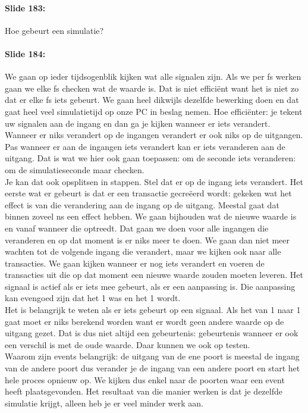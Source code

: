 \documentclass[10pt,a4paper]{book}
\begin{document}
\paragraph{Slide 183:} Hoe gebeurt een simulatie?

\paragraph{Slide 184:} We gaan op ieder tijdsogenblik kijken wat alle signalen zijn. Als we per fs werken gaan we elke fs checken wat de waarde is. Dat is niet effici\"ent want het is niet zo dat er elke fs iets gebeurt. We gaan heel dikwijls dezelfde bewerking doen en dat gaat heel veel simulatietijd op onze PC in beslag nemen. Hoe effici\"enter: je tekent uw signalen aan de ingang en dan ga je kijken wanneer er iets verandert. Wanneer er niks verandert op de ingangen verandert er ook niks op de uitgangen. Pas wanneer er aan de ingangen iets verandert kan er iets veranderen aan de uitgang. Dat is wat we hier ook gaan toepassen: om de seconde iets veranderen: om de simulatieseconde maar checken.\\
Je kan dat ook opsplitsen in stappen. Stel dat er op de ingang iets verandert. Het eerste wat er gebeurt is dat er een transactie gecre\"eerd wordt: gekeken wat het effect is van die verandering aan de ingang op de uitgang. Meestal gaat dat binnen zoveel ns een effect hebben. We gaan bijhouden wat de nieuwe waarde is en vanaf wanneer die optreedt. Dat gaan we doen voor alle ingangen die veranderen en op dat moment is er niks meer te doen. We gaan dan niet meer wachten tot de volgende ingang die verandert, maar we kijken ook naar alle transacties. We gaan kijken wanneer er nog iets verandert en voeren de transacties uit die op dat moment een nieuwe waarde zouden moeten leveren. Het signaal is actief als er iets mee gebeurt, als er een aanpassing is. Die aanpassing kan evengoed zijn dat het 1 was en het 1 wordt.\\
Het is belangrijk te weten als er iets gebeurt op een signaal. Als het van 1 naar 1 gaat moet er niks berekend worden want er wordt geen andere waarde op de uitgang gezet. Dat is dus niet altijd een gebeurtenis: gebeurtenis wanneer er ook een verschil is met de oude waarde. Daar kunnen we ook op testen.\\
Waarom zijn events belangrijk: de uitgang van de ene poort is meestal de ingang van de andere poort dus verander je de ingang van een andere poort en start het hele proces opnieuw op. We kijken dus enkel naar de poorten waar een event heeft plaatsgevonden. Het resultaat van die manier werken is dat je dezelfde simulatie krijgt, alleen heb je er veel minder werk aan.
\end{document}
